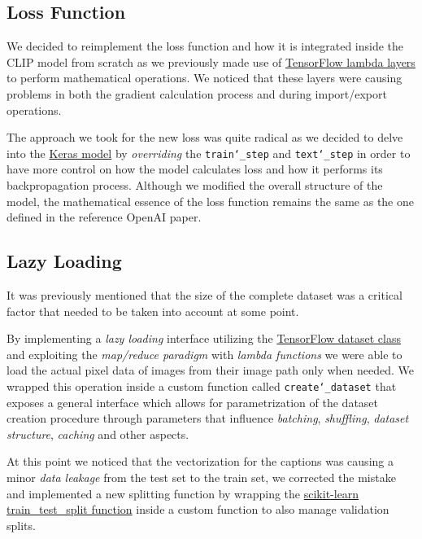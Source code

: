 \documentclass[12pt, a4paper]{article}
\begin{document}
\subsection{Loss Function}
We decided to reimplement the loss function and how it is integrated inside the CLIP model from scratch as we previously made use of \href{https://www.tensorflow.org/api_docs/python/tf/keras/layers/Lambda}{TensorFlow lambda layers} to perform mathematical operations.
We noticed that these layers were causing problems in both the gradient calculation process and during import/export operations.

The approach we took for the new loss was quite radical as we decided to delve into the \href{https://www.tensorflow.org/api_docs/python/tf/keras/Model}{Keras model} by \textit{overriding} the \texttt{train\char`_step} and \texttt{text\char`_step} in order to have more control on how the model calculates loss and how it performs its backpropagation process.
Although we modified the overall structure of the model, the mathematical essence of the loss function remains the same as the one defined in the reference OpenAI paper.

\subsection{Lazy Loading}
It was previously mentioned that the size of the complete dataset was a critical factor that needed to be taken into account at some point.

By implementing a \textit{lazy loading} interface utilizing the \href{https://www.tensorflow.org/api_docs/python/tf/data/Dataset}{TensorFlow dataset class} and exploiting the \textit{map/reduce paradigm} with \textit{lambda functions} we were able to load the actual pixel data of images from their image path only when needed.
We wrapped this operation inside a custom function called \texttt{create\char`_dataset} that exposes a general interface which allows for parametrization of the dataset creation procedure through parameters that influence \textit{batching}, \textit{shuffling}, \textit{dataset structure}, \textit{caching} and other aspects.

At this point we noticed that the vectorization for the captions was causing a minor \textit{data leakage} from the test set to the train set, we corrected the mistake and implemented a new splitting function by wrapping the \href{https://scikit-learn.org/stable/modules/generated/sklearn.model_selection.train_test_split.html}{scikit-learn train\_test\_split function} inside a custom function to also manage validation splits.
\end{document}
